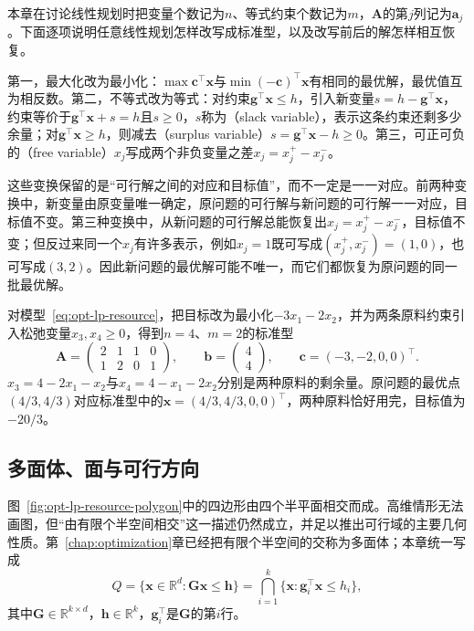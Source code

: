 本章在讨论线性规划时把变量个数记为$n$、等式约束个数记为$m$，$\bm A$的第$j$列记为$\bm a_j$。下面逐项说明任意线性规划怎样改写成标准型，以及改写前后的解怎样相互恢复。

第一，最大化改为最小化：$\max\bm c^\top\bm x$与$\min(-\bm c)^\top\bm x$有相同的最优解，最优值互为相反数。第二，不等式改为等式：对约束$\bm g^\top\bm x\le h$，引入新变量$s=h-\bm g^\top\bm x$，约束等价于$\bm g^\top\bm x+s=h$且$s\ge0$，$s$称为（slack variable），表示这条约束还剩多少余量；对$\bm g^\top\bm x\ge h$，则减去（surplus variable）$s=\bm g^\top\bm x-h\ge0$。第三，可正可负的（free variable）$x_j$写成两个非负变量之差$x_j=x_j^+-x_j^-$。

这些变换保留的是“可行解之间的对应和目标值”，而不一定是一一对应。前两种变换中，新变量由原变量唯一确定，原问题的可行解与新问题的可行解一一对应，目标值不变。第三种变换中，从新问题的可行解总能恢复出$x_j=x_j^+-x_j^-$，目标值不变；但反过来同一个$x_j$有许多表示，例如$x_j=1$既可写成$(x_j^+,x_j^-)=(1,0)$，也可写成$(3,2)$。因此新问题的最优解可能不唯一，而它们都恢复为原问题的同一批最优解。

\begin{example}[资源模型的标准型]
\label{ex:opt-lp-resource-standard}
对模型~\eqref{eq:opt-lp-resource}，把目标改为最小化$-3x_1-2x_2$，并为两条原料约束引入松弛变量$x_3,x_4\ge0$，得到$n=4$、$m=2$的标准型
\[
  \bm A=\begin{pmatrix}2&1&1&0\\1&2&0&1\end{pmatrix},\qquad
  \bm b=\begin{pmatrix}4\\4\end{pmatrix},\qquad
  \bm c=(-3,-2,0,0)^\top.
\]
$x_3=4-2x_1-x_2$与$x_4=4-x_1-2x_2$分别是两种原料的剩余量。原问题的最优点$(4/3,4/3)$对应标准型中的$\bm x=(4/3,4/3,0,0)^\top$，两种原料恰好用完，目标值为$-20/3$。
\end{example}

\subsection{多面体、面与可行方向}
\label{sec:opt-lp-polyhedra}

图~\ref{fig:opt-lp-resource-polygon}中的四边形由四个半平面相交而成。高维情形无法画图，但“由有限个半空间相交”这一描述仍然成立，并足以推出可行域的主要几何性质。第~\ref{chap:optimization}章已经把有限个半空间的交称为多面体；本章统一写成
\[
  Q=\{\bm x\in\mathbb R^d:\bm G\bm x\le\bm h\}
  =\bigcap_{i=1}^k\{\bm x:\bm g_i^\top\bm x\le h_i\},
\]
其中$\bm G\in\mathbb R^{k\times d}$，$\bm h\in\mathbb R^k$，$\bm g_i^\top$是$\bm G$的第$i$行。


